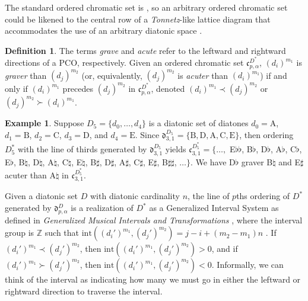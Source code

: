 \documentclass{article}
\theoremstyle{plain}
\theoremstyle{definition}
\newtheorem{definition}[theorem]{Definition}
\newtheorem{example}[theorem]{Example}
\theoremstyle{remark}
\begin{document}
The standard ordered chromatic set is  \cite{Hook}, so an arbitrary ordered chromatic set could be likened to the central row of a \textit{Tonnetz}-like lattice diagram that accommodates the use of an arbitrary diatonic space \cite{Riemann}.

\begin{definition}
	The terms \textit{grave} and \textit{acute} refer to the leftward and rightward directions of a PCO, respectively. Given an ordered chromatic set $\mathfrak{c}_{p,\alpha}^{D^\ast}$, $(d_i)^{m_1}$ is \textit{graver} than $(d_j)^{m_2}$ (or, equivalently, $(d_j)^{m_2}$ is \textit{acuter} than $(d_i)^{m_1}$) if and only if $(d_i)^{m_1}$ precedes $(d_j)^{m_2}$ in $\mathfrak{c}_{p,\alpha}^{D^\ast}$, denoted $(d_i)^{m_1}\prec(d_j)^{m_2}$ or $(d_j)^{m_2}\succ(d_i)^{m_1}$.
\end{definition}

\begin{example}
	Suppose $D_5=\{d_0,\dots,d_4\}$ is a diatonic set of diatones $d_0=\textrm{A}$, $d_1=\textrm{B}$, $d_2=\textrm{C}$, $d_3=\textrm{D}$, and $d_4=\textrm{E}$. Since $\mathfrak{d}_{3,1}^{D_5}=\{\textrm{B},\textrm{D},\textrm{A},\textrm{C},\textrm{E}\}$, then ordering $D_5^\ast$ with the line of thirds generated by $\mathfrak{d}_{3,1}^{D_5}$ yields $\mathfrak{c}_{3,1}^{D_5^\ast}=\{\dots,$ E$\flat\flat$, B$\flat$, D$\flat$, A$\flat$, C$\flat$, E$\flat$, B$\natural$, D$\natural$, A$\natural$, C$\natural$, E$\natural$, B$\sharp$, D$\sharp$, A$\sharp$, C$\sharp$, E$\sharp$, B$\sharp\sharp$, $\dots\}$. We have D$\flat$ graver B$\natural$ and E$\sharp$ acuter than A$\natural$ in $\mathfrak{c}_{3,1}^{D_5^\ast}$.
\end{example}

Given a diatonic set $D$ with diatonic cardinality $n$, the line of $p$ths ordering of $D^\ast$ generated by $\mathfrak{d}_{p,\alpha}^D$ is a realization of $D^\ast$ as a Generalized Interval System as defined in \textit{Generalized Musical Intervals and Transformations} \cite{Lewin}, where the interval group is $\mathbb{Z}$ such that $\textrm{int}{((d_i')^{m_1},(d_j')^{m_2})}=j-i+(m_2-m_1)n$ \cite{Hook}. If $(d_i')^{m_1}\prec(d_j')^{m_2}$, then $\textrm{int}{((d_i')^{m_1},(d_j')^{m_2})}>0$, and if $(d_i')^{m_1}\succ(d_j')^{m_2}$, then $\textrm{int}{((d_i')^{m_1},(d_j')^{m_2})}<0$. Informally, we can think of the interval as indicating how many  we must go in either the leftward or rightward direction to traverse the interval.
\end{document}

